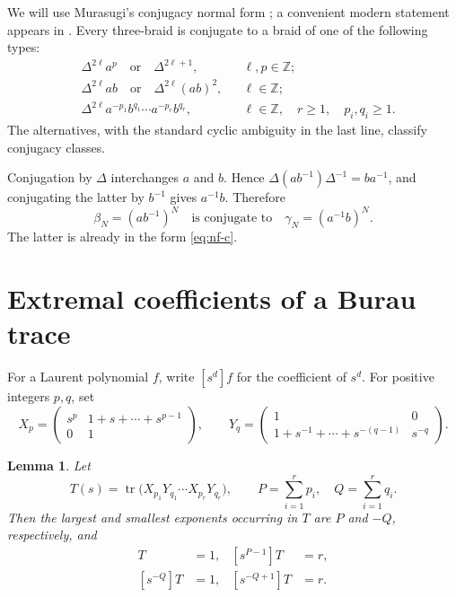 \documentclass[10pt,a4paper]{amsart}
\newtheorem{lemma}[theorem]{Lemma}
\newcommand{\tr}{\operatorname{tr}}
\begin{document}
We will use Murasugi's conjugacy normal form \cite[Proposition~2.1]{Murasugi}; a
convenient modern statement appears in \cite[Definition~4.15]{Truol}.  Every
three-braid is conjugate to a braid of one of the following types:
\begin{align}
  &\Delta^{2\ell}a^p \quad\text{or}\quad \Delta^{2\ell+1},
       &&\ell,p\in\mathbb Z; \label{eq:nf-a}\\
  &\Delta^{2\ell}ab \quad\text{or}\quad \Delta^{2\ell}(ab)^2,
       &&\ell\in\mathbb Z; \label{eq:nf-b}\\
  &\Delta^{2\ell}a^{-p_1}b^{q_1}\cdots a^{-p_r}b^{q_r},
       &&\ell\in\mathbb Z,\quad r\geq1,\quad p_i,q_i\geq1. \label{eq:nf-c}
\end{align}
The alternatives, with the standard cyclic ambiguity in the last line, classify
conjugacy classes.

Conjugation by \(\Delta\) interchanges \(a\) and \(b\).  Hence
\(\Delta(ab^{-1})\Delta^{-1}=ba^{-1}\), and conjugating the latter by \(b^{-1}\)
gives \(a^{-1}b\).  Therefore
\begin{equation}\label{eq:target-conjugate}
  \beta_N=(ab^{-1})^N
  \quad\text{is conjugate to}\quad
  \gamma_N=(a^{-1}b)^N.
\end{equation}
The latter is already in the form \eqref{eq:nf-c}.

\section{Extremal coefficients of a Burau trace}

For a Laurent polynomial \(f\), write \([s^d]f\) for the coefficient of \(s^d\).
For positive integers \(p,q\), set
\[
 X_p=
 \begin{pmatrix}
 s^p&1+s+\cdots+s^{p-1}\\0&1
 \end{pmatrix},
 \qquad
 Y_q=
 \begin{pmatrix}
 1&0\\1+s^{-1}+\cdots+s^{-(q-1)}&s^{-q}
 \end{pmatrix}.
\]

\begin{lemma}\label{lem:trace-coefficients}
Let
\[
  T(s)=\tr\bigl(X_{p_1}Y_{q_1}\cdots X_{p_r}Y_{q_r}\bigr),
  \qquad
  P=\sum_{i=1}^r p_i,
  \quad Q=\sum_{i=1}^r q_i.
\]
Then the largest and smallest exponents occurring in \(T\) are \(P\) and \(-Q\),
respectively, and
\begin{align*}
  [s^P]T&=1,& [s^{P-1}]T&=r,\\
  [s^{-Q}]T&=1,& [s^{-Q+1}]T&=r.
\end{align*}
\end{lemma}
\end{document}
